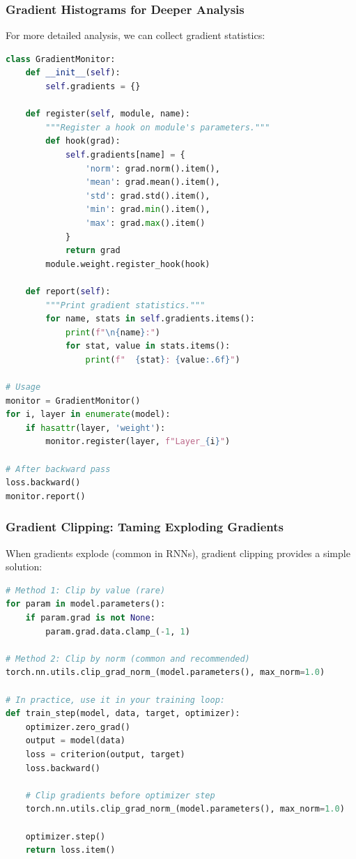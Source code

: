 \documentclass{article}
\begin{document}
\subsubsection{Gradient Histograms for Deeper Analysis}

For more detailed analysis, we can collect gradient statistics:

\begin{lstlisting}[language=Python]
class GradientMonitor:
    def __init__(self):
        self.gradients = {}
        
    def register(self, module, name):
        """Register a hook on module's parameters."""
        def hook(grad):
            self.gradients[name] = {
                'norm': grad.norm().item(),
                'mean': grad.mean().item(),
                'std': grad.std().item(),
                'min': grad.min().item(),
                'max': grad.max().item()
            }
            return grad
        module.weight.register_hook(hook)
    
    def report(self):
        """Print gradient statistics."""
        for name, stats in self.gradients.items():
            print(f"\n{name}:")
            for stat, value in stats.items():
                print(f"  {stat}: {value:.6f}")

# Usage
monitor = GradientMonitor()
for i, layer in enumerate(model):
    if hasattr(layer, 'weight'):
        monitor.register(layer, f"Layer_{i}")

# After backward pass
loss.backward()
monitor.report()
\end{lstlisting}

\subsubsection{Gradient Clipping: Taming Exploding Gradients}

When gradients explode (common in RNNs), gradient clipping provides a simple solution:

\begin{lstlisting}[language=Python]
# Method 1: Clip by value (rare)
for param in model.parameters():
    if param.grad is not None:
        param.grad.data.clamp_(-1, 1)

# Method 2: Clip by norm (common and recommended)
torch.nn.utils.clip_grad_norm_(model.parameters(), max_norm=1.0)

# In practice, use it in your training loop:
def train_step(model, data, target, optimizer):
    optimizer.zero_grad()
    output = model(data)
    loss = criterion(output, target)
    loss.backward()
    
    # Clip gradients before optimizer step
    torch.nn.utils.clip_grad_norm_(model.parameters(), max_norm=1.0)
    
    optimizer.step()
    return loss.item()
\end{lstlisting}
\end{document}

